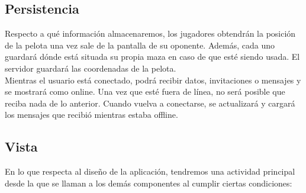 \documentclass[a4paper,openright,12pt]{article}
\begin{document}
\subsection{Persistencia}
Respecto a qué información almacenaremos, los jugadores obtendrán la posición de la pelota una vez sale de la pantalla de su oponente. Además, cada uno guardará dónde está situada su propia maza en caso de que esté siendo usada. El servidor guardará las coordenadas de la pelota. \\
Mientras el usuario está conectado, podrá recibir datos, invitaciones o mensajes y se mostrará como online. Una vez que esté fuera de línea, no será posible que reciba nada de lo anterior. Cuando vuelva a conectarse, se actualizará y cargará los mensajes que recibió mientras estaba offline.

\subsection{Vista}
En lo que respecta al diseño de la aplicación, tendremos una actividad principal desde la que se llaman a los demás componentes al cumplir ciertas condiciones:\\
\end{document}
